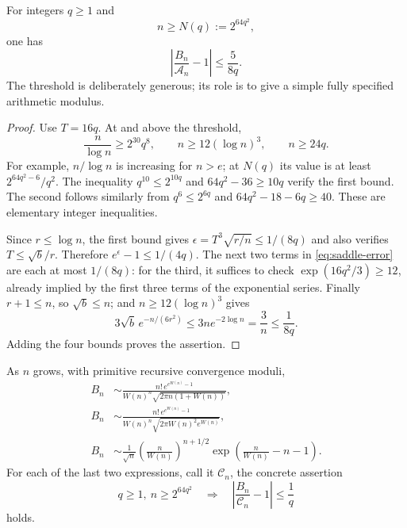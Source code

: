 \begin{theorem}
\label{thm:saddle-modulus}
For integers $q\geq1$ and
\begin{equation}\label{eq:saddle-modulus}
 n\geq N(q):=2^{64q^2},
\end{equation}
one has
\begin{equation}\label{eq:saddle-relative-modulus}
 \left|\frac{B_n}{\mathcal A_n}-1\right|\leq\frac5{8q}.
\end{equation}
The threshold is deliberately generous; its role is to give a simple
fully specified arithmetic modulus.
\end{theorem}

\begin{proof}
Use $T=16q$.  At and above the threshold,
\[
 \frac n{\log n}\geq2^{30}q^8,
 \qquad n\geq12(\log n)^3,
 \qquad n\geq24q.
\]
For example, $n/\log n$ is increasing for $n>e$; at $N(q)$ its
value is at least $2^{64q^2-6}/q^2$.  The inequality
$q^{10}\leq2^{10q}$ and $64q^2-36\geq10q$ verify the first
bound.  The second follows similarly from
$q^6\leq2^{6q}$ and $64q^2-18-6q\geq40$.  These are elementary
integer inequalities.

Since $r\leq\log n$, the first bound gives
$\epsilon=T^3\sqrt{r/n}\leq1/(8q)$ and also verifies
$T\leq\sqrt b/r$.  Therefore $e^\epsilon-1\leq1/(4q)$.
The next two terms in \eqref{eq:saddle-error} are each at most
$1/(8q)$: for the third, it suffices to check
$\exp(16q^2/3)\geq12$, already implied by the first three terms of
the exponential series.  Finally $r+1\leq n$, so $\sqrt b\leq n$;
and $n\geq12(\log n)^3$ gives
\[
 3\sqrt b\,e^{-n/(6r^2)}
 \leq3n e^{-2\log n}=\frac3n\leq\frac1{8q}.
\]
Adding the four bounds proves the assertion.
\end{proof}

\begin{corollary}
\label{cor:lambert-asymptotic}
As $n$ grows, with primitive recursive convergence moduli,
\begin{align}
 B_n&\sim\frac{n!\,e^{e^{W(n)}-1}}
                  {W(n)^n\sqrt{2\pi n(1+W(n))}},
 \label{eq:precise-saddle-equivalent}\\
 B_n&\sim\frac{n!\,e^{e^{W(n)}-1}}
                  {W(n)^n\sqrt{2\pi W(n)^2e^{W(n)}}},
 \label{eq:odlyzko-equivalent}\\
 B_n&\sim\frac1{\sqrt n}
          \left(\frac n{W(n)}\right)^{n+1/2}
          \exp\left(\frac n{W(n)}-n-1\right).
 \label{eq:wikipedia-equivalent}
\end{align}
For each of the last two expressions, call it $\mathcal C_n$,
the concrete assertion
\begin{equation}\label{eq:lambert-relative-modulus}
 q\geq1,\ n\geq2^{64q^2}\quad\Longrightarrow\quad
 \left|\frac{B_n}{\mathcal C_n}-1\right|\leq\frac1q
\end{equation}
holds.
\end{corollary}

